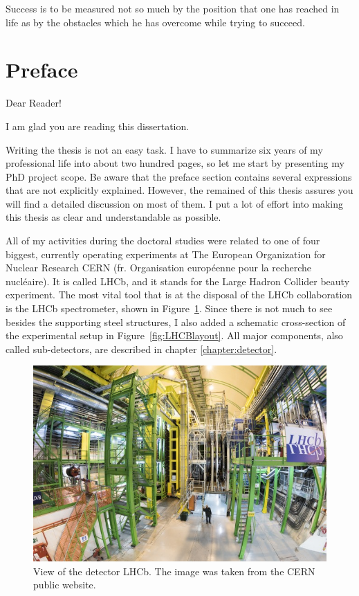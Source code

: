 \begin{savequote}[75mm] 
Success is to be measured not so much by the position that one has reached in life as by the obstacles which he has overcome while trying to succeed.
\end{savequote}



\chapter*{Preface}
\label{introduction}

Dear Reader! 

I am glad you are reading this dissertation.  

Writing the thesis is not an easy task. I have to summarize six years of my professional life into about two hundred pages, so let me start by presenting my PhD project scope.  Be aware that the preface section contains several expressions that are not explicitly explained. However, the remained of this thesis assures you will find a detailed discussion on most of them. I put a lot of effort into making this thesis as clear and understandable as possible. 

All of my activities during the doctoral studies were related to one of four biggest, currently operating experiments at The European Organization for Nuclear Research CERN (fr.  Organisation européenne pour la recherche nucléaire).  It is called LHCb, and it stands for the Large Hadron Collider beauty experiment. The most vital tool that is at the disposal of the LHCb collaboration is the LHCb spectrometer, shown in Figure~\ref{fig:LHCBphoto}. Since there is not much to see besides the supporting steel structures, I also added a schematic cross-section of the experimental setup in Figure~\ref{fig:LHCBlayout}. All major components, also called sub-detectors, are described in chapter \ref{chapter:detector}. 


\begin{figure}[!hb]
\centering
\includegraphics[width=\textwidth]{figures/LHCB_photo}
\caption{View of the detector LHCb. The image was taken from the CERN public website. 
\label{fig:LHCBphoto}}
\end{figure}

